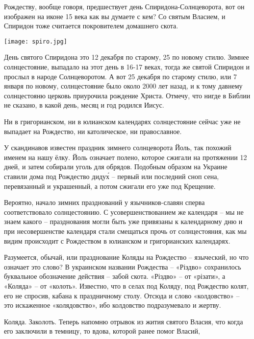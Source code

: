 \documentclass[a5paper,11pt,openany]{article}
\begin{document}
   Рождеству, вообще говоря, предшествует день Спиридона-Солнцеворота, вот он изображен на иконе 15 века как вы думаете с кем? Со святым Власием, и Спиридон тоже считается покровителем домашнего скота.

\begin{center}
\texttt{[image: spiro.jpg]}
\end{center}

  День святого Спиридона это 12 декабря по старому, 25 по новому стилю. Зимнее солнцестояние, выпадало на этот день в 16-17 веках, тогда же святой Спиридон и прослыл в народе Солнцеворотом. А вот 25 декабря по старому стилю, или 7 января по новому, солнцестояние было около 2000 лет назад, и к тому давнему солнцестояню церковь приурочила рождение Христа. Отмечу, что нигде в Библии не сказано, в какой день, месяц и год родился Иисус.

   Ни в григорианском, ни в юлианском календарях солнцестояние сейчас уже не выпадает на Рождество, ни католическое, ни православное.

   У скандинавов известен праздник зимнего солнцеворота Йоль, так похожий именем на нашу ёлку. Йоль означает полено, которое сжигали на протяжении 12 дней, и затем собирали уголь для обрядов. Подобным образом на Украине ставили дома под Рождество диду\'х – первый или последний сноп сена, перевязанный и украшенный, а потом сжигали его уже под Крещение.

   Вероятно, начало зимних празднований у язычников-славян сперва соответствовало  солнцестоянию. С усовершенствованием же календаря – мы не знаем какого – празднования могли быть уже привязаны к календарному дню и при несовершенстве календаря стали смещаться прочь от солнцестояния, как мы видим происходит с Рождеством в юлианском и григорианских календарях.

  Разумеется, обычай, или празднование Коляды на Рождество – языческий, но что означает это слово? В украинском названии
Рождества – «Різдво» сохранилось буквальное обозначение действия – забой скота. «Різдво» – от «різати», а «Коляда» – от «колоть». Известно, что в селах под Коляду, под Рождество колят, его не спросив, кабана к праздничному столу. Отсюда и слово «колдовство» – это искаженное «колядовство», ибо колдовство подразумевало и жертву.


   Коляда. Заколоть. Теперь напомню отрывок из жития святого Власия, что когда его заключили в темницу, то вдова, которой ранее помог Власий,
\end{document}

